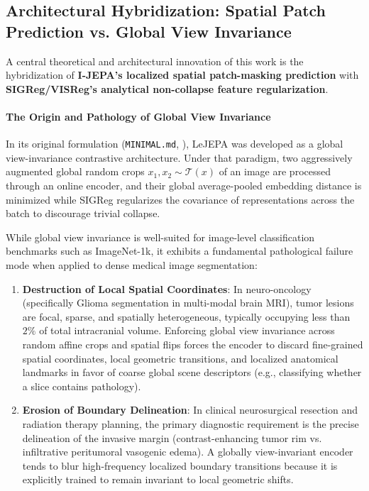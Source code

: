 \documentclass{article}
\begin{document}
\subsection{Architectural Hybridization: Spatial Patch Prediction vs. Global View Invariance}

A central theoretical and architectural innovation of this work is the hybridization of \textbf{I-JEPA's localized spatial patch-masking prediction} with \textbf{SIGReg/VISReg's analytical non-collapse feature regularization}.

\paragraph{The Origin and Pathology of Global View Invariance}
In its original formulation (\texttt{MINIMAL.md}, \citet{balestriero2025lejepa}), LeJEPA was developed as a global view-invariance contrastive architecture. Under that paradigm, two aggressively augmented global random crops $x_1, x_2 \sim \mathcal{T}(x)$ of an image are processed through an online encoder, and their global average-pooled embedding distance is minimized while SIGReg regularizes the covariance of representations across the batch to discourage trivial collapse.

While global view invariance is well-suited for image-level classification benchmarks such as ImageNet-1k, it exhibits a fundamental pathological failure mode when applied to dense medical image segmentation:
\begin{enumerate}
    \item \textbf{Destruction of Local Spatial Coordinates}: In neuro-oncology (specifically Glioma segmentation in multi-modal brain MRI), tumor lesions are focal, sparse, and spatially heterogeneous, typically occupying less than $2\%$ of total intracranial volume. Enforcing global view invariance across random affine crops and spatial flips forces the encoder to discard fine-grained spatial coordinates, local geometric transitions, and localized anatomical landmarks in favor of coarse global scene descriptors (e.g., classifying whether a slice contains pathology).
    \item \textbf{Erosion of Boundary Delineation}: In clinical neurosurgical resection and radiation therapy planning, the primary diagnostic requirement is the precise delineation of the invasive margin (contrast-enhancing tumor rim vs. infiltrative peritumoral vasogenic edema). A globally view-invariant encoder tends to blur high-frequency localized boundary transitions because it is explicitly trained to remain invariant to local geometric shifts.
\end{enumerate}
\end{document}
